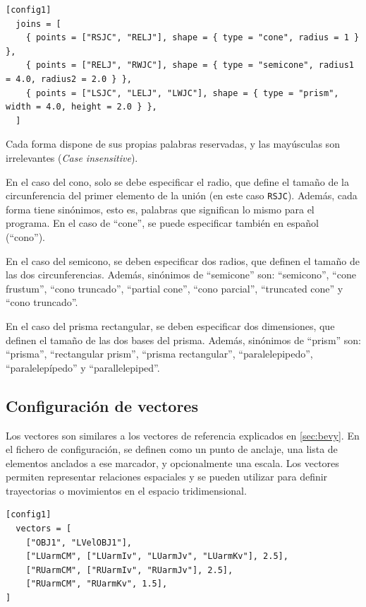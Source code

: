 \begin{lstlisting}[style=mystyle, caption={Uso de formas}, label={lst:cfg-formas}] 
[config1]
  joins = [
    { points = ["RSJC", "RELJ"], shape = { type = "cone", radius = 1 } },
    { points = ["RELJ", "RWJC"], shape = { type = "semicone", radius1 = 4.0, radius2 = 2.0 } },
    { points = ["LSJC", "LELJ", "LWJC"], shape = { type = "prism", width = 4.0, height = 2.0 } },
  ]
\end{lstlisting}

Cada forma dispone de sus propias palabras reservadas, y las mayúsculas son irrelevantes (\textit{Case insensitive}). 

En el caso del cono, solo se debe especificar el radio, que define el tamaño de la circunferencia del primer elemento de la unión (en este caso \texttt{RSJC}). Además, cada forma tiene sinónimos, esto es, palabras que significan lo mismo para el programa. En el caso de ``cone'', se puede especificar también en español (``cono'').

En el caso del semicono, se deben especificar dos radios, que definen el tamaño de las dos circunferencias. Además, sinónimos de ``semicone'' son: ``semicono'', ``cone frustum'', ``cono truncado'', ``partial cone'', ``cono parcial'', ``truncated cone'' y ``cono truncado''.

En el caso del prisma rectangular, se deben especificar dos dimensiones, que definen el tamaño de las dos bases del prisma. Además, sinónimos de ``prism'' son: ``prisma'', ``rectangular prism'', ``prisma rectangular'', ``paralelepipedo'', ``paralelepípedo'' y ``parallelepiped''.

\subsection{Configuración de vectores}

Los vectores son similares a los vectores de referencia explicados en \autoref{sec:bevy}. En el fichero de configuración, se definen como un punto de anclaje, una lista de elementos anclados a ese marcador, y opcionalmente una escala. Los vectores permiten representar relaciones espaciales y se pueden utilizar para definir trayectorias o movimientos en el espacio tridimensional.

\begin{lstlisting}[style=mystyle, caption={Configuración de un vector}, label={lst:cfg-vector}]
[config1]
  vectors = [ 
    ["OBJ1", "LVelOBJ1"],
    ["LUarmCM", ["LUarmIv", "LUarmJv", "LUarmKv"], 2.5],
    ["RUarmCM", ["RUarmIv", "RUarmJv"], 2.5],
    ["RUarmCM", "RUarmKv", 1.5],
]
\end{lstlisting}

